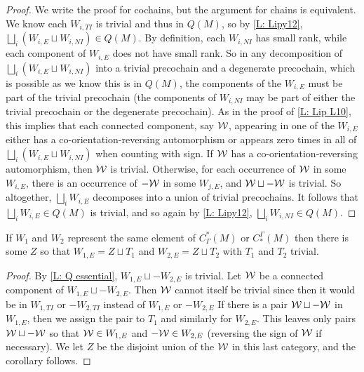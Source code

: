 \begin{proof}
	We write the proof for cochains, but the argument for chains is equivalent.
	We know each $W_{i,TI}$ is trivial and thus in $Q(M)$, so by \cref{L: Lipy12}, $\bigsqcup_i (W_{i,E} \sqcup W_{i,NI}) \in Q(M)$.
	By definition, each $W_{i,NI}$ has small rank, while each component of $W_{i,E}$ does not have small rank.
	So in any decomposition of $\bigsqcup_i (W_{i,E} \sqcup W_{i,NI})$ into a trivial precochain and a degenerate precochain, which is possible as we know this is in $Q(M)$, the components of the $W_{i,E}$ must be part of the trivial precochain (the components of $W_{i, NI}$ may be part of either the trivial precochain or the degenerate precochain).
	As in the proof of \cref{L: Lip L10}, this implies that each connected component, say $\mathcal{W}$, appearing in one of the $W_{i,E}$ either has a co-orientation-reversing automorphism or appears zero times in all of $\bigsqcup_i (W_{i,E} \sqcup W_{i,NI})$ when counting with sign.
	If $\mathcal{W}$ has a co-orientation-reversing automorphism, then $\mathcal{W}$ is trivial.
	Otherwise, for each occurrence of $\mathcal{W}$ in some $W_{i,E}$, there is an occurrence of $-\mathcal{W}$ in some $W_{j,E}$, and $\mathcal{W} \sqcup -\mathcal{W}$ is trivial.
	So altogether, $\bigsqcup_i W_{i,E}$ decomposes into a union of trivial precochains.
	It follows that $\bigsqcup_i W_{i,E} \in Q(M)$ is trivial, and so again by \cref{L: Lipy12}, $\bigsqcup_i W_{i,NI} \in Q(M)$.
\end{proof}

\begin{corollary}\label{C: Q essential}
	If $W_1$ and $W_2$ represent the same element of $C^*_\Gamma(M)$ or $C_*^\Gamma(M)$ then there is some $Z$ so that $W_{1,E} = Z \sqcup T_1$ and $W_{2,E} = Z \sqcup T_2$ with $T_1$ and $T_2$ trivial.
\end{corollary}

\begin{proof}
	By \cref{L: Q essential}, $W_{1,E} \sqcup -W_{2,E}$ is trivial.
	Let $\mathcal{W}$ be a connected component of $W_{1,E} \sqcup -W_{2,E}$.
	Then $\mathcal{W}$ cannot itself be trivial since then it would be in $W_{1,TI}$ or $-W_{2,TI}$ instead of $W_{1,E}$ or $-W_{2,E}$
	If there is a pair $\mathcal{W} \sqcup -\mathcal{W}$ in $W_{1,E}$, then we assign the pair to $T_1$ and similarly for $W_{2,E}$.
	This leaves only pairs $\mathcal{W} \sqcup -\mathcal{W}$ so that $\mathcal{W} \in W_{1,E}$ and $-\mathcal{W} \in W_{2,E}$ (reversing the sign of $\mathcal{W}$ if necessary).
	We let $Z$ be the disjoint union of the $\mathcal{W}$ in this last category, and the corollary follows.
\end{proof}

